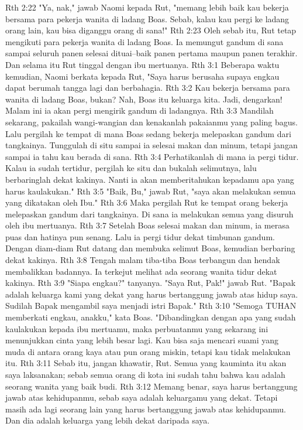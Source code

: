 Rth 2:22  "Ya, nak," jawab Naomi kepada Rut, "memang lebih baik kau bekerja bersama para pekerja wanita di ladang Boas. Sebab, kalau kau pergi ke ladang orang lain, kau bisa diganggu orang di sana!"
Rth 2:23  Oleh sebab itu, Rut tetap mengikuti para pekerja wanita di ladang Boas. Ia memungut gandum di sana sampai seluruh panen selesai dituai--baik panen pertama maupun panen terakhir. Dan selama itu Rut tinggal dengan ibu mertuanya.
Rth 3:1  Beberapa waktu kemudian, Naomi berkata kepada Rut, "Saya harus berusaha supaya engkau dapat berumah tangga lagi dan berbahagia.
Rth 3:2  Kau bekerja bersama para wanita di ladang Boas, bukan? Nah, Boas itu keluarga kita. Jadi, dengarkan! Malam ini ia akan pergi mengirik gandum di ladangnya.
Rth 3:3  Mandilah sekarang, pakailah wangi-wangian dan kenakanlah pakaianmu yang paling bagus. Lalu pergilah ke tempat di mana Boas sedang bekerja melepaskan gandum dari tangkainya. Tunggulah di situ sampai ia selesai makan dan minum, tetapi jangan sampai ia tahu kau berada di sana.
Rth 3:4  Perhatikanlah di mana ia pergi tidur. Kalau ia sudah tertidur, pergilah ke situ dan bukalah selimutnya, lalu berbaringlah dekat kakinya. Nanti ia akan memberitahukan kepadamu apa yang harus kaulakukan."
Rth 3:5  "Baik, Bu," jawab Rut, "saya akan melakukan semua yang dikatakan oleh Ibu."
Rth 3:6  Maka pergilah Rut ke tempat orang bekerja melepaskan gandum dari tangkainya. Di sana ia melakukan semua yang disuruh oleh ibu mertuanya.
Rth 3:7  Setelah Boas selesai makan dan minum, ia merasa puas dan hatinya pun senang. Lalu ia pergi tidur dekat timbunan gandum. Dengan diam-diam Rut datang dan membuka selimut Boas, kemudian berbaring dekat kakinya.
Rth 3:8  Tengah malam tiba-tiba Boas terbangun dan hendak membalikkan badannya. Ia terkejut melihat ada seorang wanita tidur dekat kakinya.
Rth 3:9  "Siapa engkau?" tanyanya. "Saya Rut, Pak!" jawab Rut. "Bapak adalah keluarga kami yang dekat yang harus bertanggung jawab atas hidup saya. Sudilah Bapak mengambil saya menjadi istri Bapak."
Rth 3:10  "Semoga TUHAN memberkati engkau, anakku," kata Boas. "Dibandingkan dengan apa yang sudah kaulakukan kepada ibu mertuamu, maka perbuatanmu yang sekarang ini menunjukkan cinta yang lebih besar lagi. Kau bisa saja mencari suami yang muda di antara orang kaya atau pun orang miskin, tetapi kau tidak melakukan itu.
Rth 3:11  Sebab itu, jangan khawatir, Rut. Semua yang kauminta itu akan saya laksanakan; sebab semua orang di kota ini sudah tahu bahwa kau adalah seorang wanita yang baik budi.
Rth 3:12  Memang benar, saya harus bertanggung jawab atas kehidupanmu, sebab saya adalah keluargamu yang dekat. Tetapi masih ada lagi seorang lain yang harus bertanggung jawab atas kehidupanmu. Dan dia adalah keluarga yang lebih dekat daripada saya.
